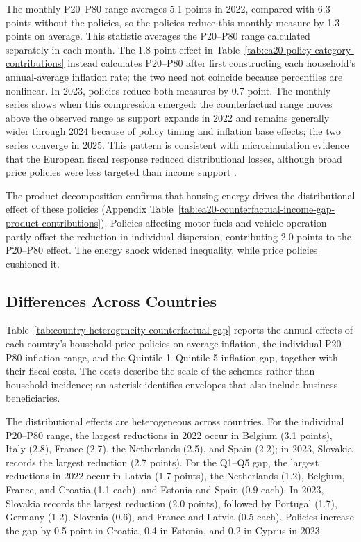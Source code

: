 \documentclass[11pt]{article}
\begin{document}
The monthly P20--P80 range averages 5.1 points in 2022, compared with 6.3 points without the
policies, so the policies reduce this monthly measure by 1.3 points on average. This statistic
averages the P20--P80 range calculated separately in each month. The 1.8-point effect in
Table~\ref{tab:ea20-policy-category-contributions} instead calculates P20--P80 after first constructing
each household's annual-average inflation rate; the two need not coincide because percentiles are
nonlinear. In 2023, policies reduce both measures by 0.7 point. The monthly series shows when this
compression emerged: the counterfactual range moves above the observed range as support expands
in 2022 and remains generally wider through 2024 because of policy timing and inflation base effects;
the two series converge in 2025. This pattern is consistent
with microsimulation evidence that the European fiscal response reduced distributional losses,
although broad price policies were less targeted than income support
\citep{amores2025inflation}.

The product decomposition confirms that housing energy drives the distributional effect of these
policies (Appendix Table~\ref{tab:ea20-counterfactual-income-gap-product-contributions}). Policies
affecting motor fuels and vehicle operation partly offset the reduction in individual dispersion, contributing 2.0
points to the P20--P80 effect. The energy shock widened inequality, while price policies cushioned it.

\subsection{Differences Across Countries}
\label{sec:fiscal-policy-inflation-inequalities}

Table~\ref{tab:country-heterogeneity-counterfactual-gap} reports the annual effects of each country's
household price policies on average inflation, the individual P20--P80 inflation range, and the
Quintile 1--Quintile 5 inflation gap, together with their fiscal costs. The costs describe the scale
of the schemes rather than household incidence; an asterisk identifies envelopes that also include
business beneficiaries.



The distributional effects are heterogeneous across countries. For the individual P20--P80 range,
the largest reductions in 2022 occur in Belgium (3.1 points), Italy (2.8), France (2.7), the
Netherlands (2.5), and Spain (2.2); in 2023, Slovakia records the largest reduction (2.7 points).
For the Q1--Q5 gap,
the largest reductions in 2022 occur in Latvia (1.7 points), the Netherlands (1.2), Belgium, France,
and Croatia (1.1 each), and Estonia and Spain (0.9 each). In 2023, Slovakia records the largest
reduction (2.0 points), followed by Portugal (1.7), Germany (1.2), Slovenia (0.6), and France and
Latvia (0.5 each). Policies increase the gap by 0.5 point in Croatia, 0.4 in Estonia, and 0.2 in
Cyprus in 2023.
\end{document}
